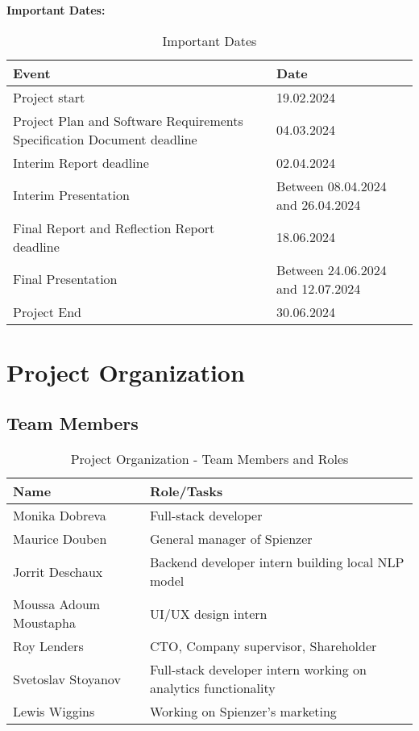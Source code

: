 \documentclass[12pt,a4paper]{article}
\begin{document}
\newpage %

\begin{center} %
{\small\bfseries Important Dates:\par} %
\end{center}

\begin{table}[h!]
\centering
\begin{adjustbox}{scale=1,center}
\begin{tabular}{|l|l|}
\hline
\textbf{Event} & \textbf{Date} \\
\hline
Project start & 19.02.2024 \\ \hline
Project Plan and Software Requirements Specification Document deadline & 04.03.2024 \\ \hline
Interim Report deadline & 02.04.2024 \\ \hline
Interim Presentation & Between 08.04.2024 and 26.04.2024 \\ \hline
Final Report and Reflection Report deadline & 18.06.2024 \\ \hline
Final Presentation & Between 24.06.2024 and 12.07.2024 \\ \hline
Project End & 30.06.2024 \\
\hline
\end{tabular}
\end{adjustbox}
\caption{Important Dates}
\end{table}




\vspace{\baselineskip} %

\section{Project Organization}
\subsection{Team Members}


\begin{table}[h!]
\centering
\begin{tabular}{|l|l|}
\hline
\textbf{Name} & \textbf{Role/Tasks} \\
\hline
Monika Dobreva & Full-stack developer \\
\hline
Maurice Douben & General manager of Spienzer \\
\hline
Jorrit Deschaux & Backend developer intern building local NLP model \\
\hline
Moussa Adoum Moustapha & UI/UX design intern \\
\hline
Roy Lenders & CTO, Company supervisor, Shareholder \\
\hline
Svetoslav Stoyanov & Full-stack developer intern working on analytics functionality \\
\hline
Lewis Wiggins & Working on Spienzer’s marketing \\
\hline
\end{tabular}
\caption{Project Organization - Team Members and Roles}
\end{table}
\end{document}
